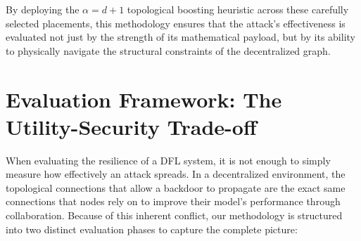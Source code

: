 By deploying the $\alpha = d + 1$ topological boosting heuristic across these carefully selected placements, this methodology ensures that the attack's effectiveness is evaluated not just by the strength of its mathematical payload, but by its ability to physically navigate the structural constraints of the decentralized graph.

\section{Evaluation Framework: The Utility-Security Trade-off} \label{sec:utility_security}
When evaluating the resilience of a DFL system, it is not enough to simply measure how effectively an attack spreads. In a decentralized environment, the topological connections that allow a backdoor to propagate are the exact same connections that nodes rely on to improve their model's performance through collaboration. 
Because of this inherent conflict, our methodology is structured into two distinct evaluation phases to capture the complete picture:
